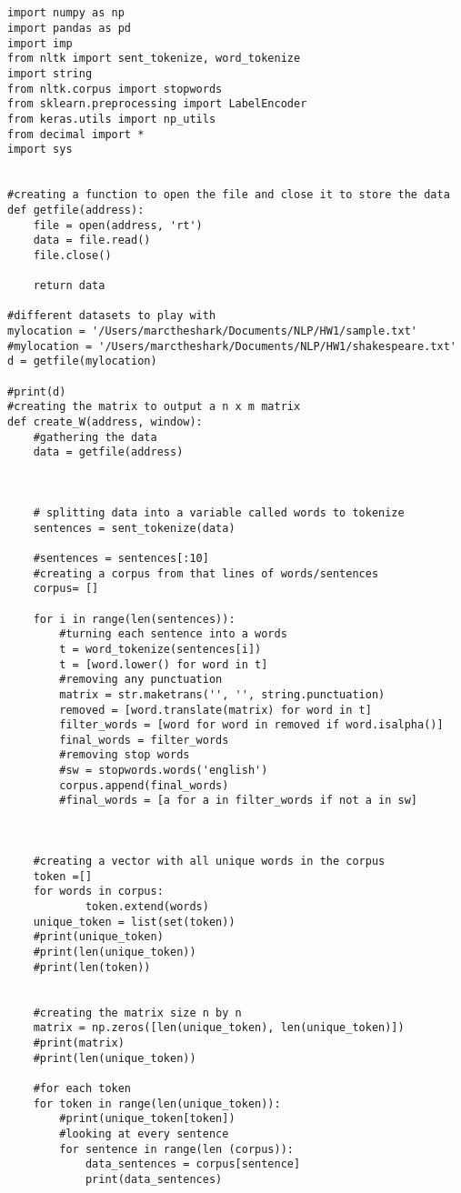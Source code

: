 \documentclass[12pt,a4paper]{report}
\begin{document}
\lstset{language = Python}
\begin{lstlisting}


import numpy as np
import pandas as pd
import imp
from nltk import sent_tokenize, word_tokenize
import string
from nltk.corpus import stopwords
from sklearn.preprocessing import LabelEncoder
from keras.utils import np_utils
from decimal import *
import sys


#creating a function to open the file and close it to store the data
def getfile(address):
    file = open(address, 'rt')
    data = file.read()
    file.close()

    return data

#different datasets to play with
mylocation = '/Users/marctheshark/Documents/NLP/HW1/sample.txt'
#mylocation = '/Users/marctheshark/Documents/NLP/HW1/shakespeare.txt'
d = getfile(mylocation)

#print(d)
#creating the matrix to output a n x m matrix
def create_W(address, window):
	#gathering the data
    data = getfile(address)



    # splitting data into a variable called words to tokenize
    sentences = sent_tokenize(data)
	
    #sentences = sentences[:10]
    #creating a corpus from that lines of words/sentences
    corpus= []
    
    for i in range(len(sentences)):
        #turning each sentence into a words
        t = word_tokenize(sentences[i])
        t = [word.lower() for word in t]
        #removing any punctuation
        matrix = str.maketrans('', '', string.punctuation)
        removed = [word.translate(matrix) for word in t]
        filter_words = [word for word in removed if word.isalpha()]
        final_words = filter_words
        #removing stop words
        #sw = stopwords.words('english')
        corpus.append(final_words)
        #final_words = [a for a in filter_words if not a in sw]



	#creating a vector with all unique words in the corpus
    token =[]
    for words in corpus:
            token.extend(words)
    unique_token = list(set(token))
    #print(unique_token)
    #print(len(unique_token))
    #print(len(token))

    
    #creating the matrix size n by n
    matrix = np.zeros([len(unique_token), len(unique_token)])
    #print(matrix)
    #print(len(unique_token))

    #for each token
    for token in range(len(unique_token)):
        #print(unique_token[token])
        #looking at every sentence
        for sentence in range(len (corpus)):
            data_sentences = corpus[sentence]
            print(data_sentences)
            

\end{lstlisting}
\end{document}
